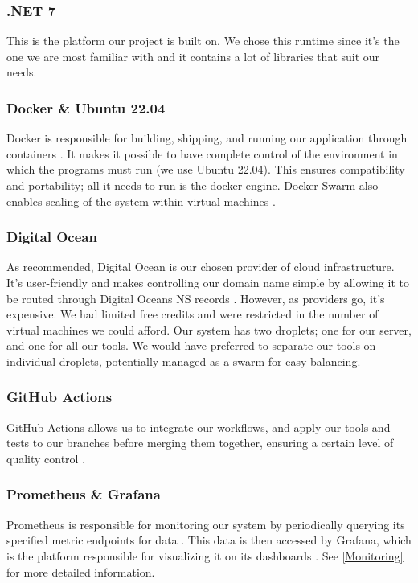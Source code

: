 \subsubsection{.NET 7}
This is the platform our project is built on. We chose this runtime since it's the one we are most familiar with and it contains a lot of libraries that suit our needs.

\subsubsection{Docker \& Ubuntu 22.04}
Docker is responsible for building, shipping, and running our application through containers \autocite{docker}. It makes it possible to have complete control of the environment in which the programs must run (we use Ubuntu 22.04). This ensures compatibility and portability; all it needs to run is the docker engine. Docker Swarm also enables scaling of the system within virtual machines \autocite{docker-swarm}.

\subsubsection{Digital Ocean}
As recommended, Digital Ocean is our chosen provider of cloud infrastructure. It's user-friendly and makes controlling our domain name simple by allowing it to be routed through Digital Oceans NS records \autocite{digitalocean}. However, as providers go, it's expensive. We had limited free credits and were restricted in the number of virtual machines we could afford. Our system has two droplets; one for our server, and one for all our tools. We would have preferred to separate our tools on individual droplets, potentially managed as a swarm for easy balancing.

\subsubsection{GitHub Actions}
GitHub Actions allows us to integrate our workflows, and apply our tools and tests to our branches before merging them together, ensuring a certain level of quality control \autocite{github-actions}.

\subsubsection{Prometheus \& Grafana}
Prometheus is responsible for monitoring our system by periodically querying its specified metric endpoints for data \autocite{prometheus}. This data is then accessed by Grafana, which is the platform responsible for visualizing it on its dashboards \autocite{grafana}. See \ref{Monitoring} for more detailed information.

